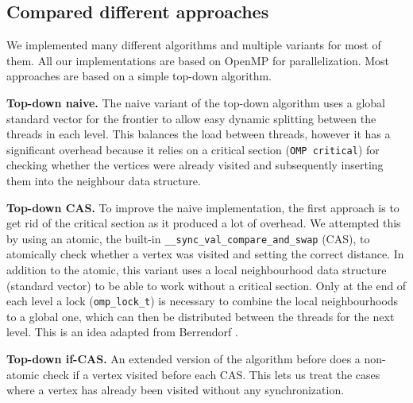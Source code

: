 \documentclass[letterpaper]{article}
\newcommand{\mypar}[1]{{\bf #1.}} %
\begin{document}
		\subsection{Compared different approaches}\label{sec:approaches}
		
		We implemented many different algorithms and multiple variants for most of them. 			%
		All our implementations are based on OpenMP for parallelization.
		Most approaches are based on a simple top-down algorithm. 

		\mypar{Top-down naive}
		The naive variant of the top-down algorithm uses a global standard vector for the frontier to allow easy dynamic splitting between the threads in each level. 
		This balances the load between threads, however it has a significant overhead because it relies on a critical section (\verb+OMP critical+) for checking whether the vertices were already visited and subsequently inserting them into the neighbour data structure.

		\mypar{Top-down CAS}
		To improve the naive implementation, the first approach is to get rid of the critical section as it produced a lot of overhead. 
		We attempted this by using an atomic, the built-in \verb+__sync_val_compare_and_swap+ (CAS), to atomically check whether a vertex was visited and setting the correct distance. 
		In addition to the atomic, this variant uses a local neighbourhood data structure (standard vector) to be able to work without a critical section. 
		Only at the end of each level a lock (\verb+omp_lock_t+) is necessary to combine the local neighbourhoods to a global one, which can then be distributed between the threads for the next level. 
		This is an idea adapted from Berrendorf \cite{Berrendorf:14}.
		
		\mypar{Top-down if-CAS}
		An extended version of the algorithm before does a non-atomic check if a vertex visited before each CAS. 
		This lets us treat the cases where a vertex has already been visited without any synchronization.
\end{document}
